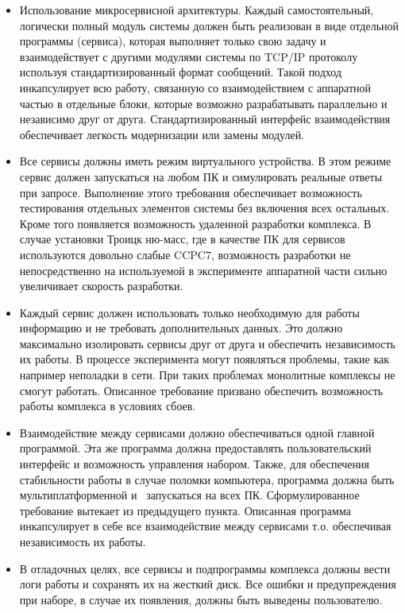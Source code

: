 \documentclass[a4paper,14pt]{extreport}
\begin{document}
\begin{itemize}
    \item Использование микросервисной архитектуры. Каждый самостоятельный, логически полный модуль системы должен быть реализован в виде отдельной программы (сервиса), которая выполняет только свою задачу и взаимодействует с другими модулями системы по TCP/IP протоколу используя стандартизированный формат сообщений. Такой подход инкапсулирует всю работу, связанную со взаимодействием с аппаратной частью в отдельные блоки, которые возможно разрабатывать параллельно и независимо друг от друга. Стандартизированный интерфейс взаимодействия обеспечивает легкость модернизации или замены модулей.
    \item Все сервисы должны иметь режим виртуального устройства. В этом режиме сервис должен запускаться на любом ПК и симулировать реальные ответы при запросе. Выполнение этого требования обеспечивает возможность тестирования отдельных элементов системы без включения всех остальных. Кроме того появляется возможность удаленной разработки комплекса. В случае установки Троицк ню-масс, где в качестве ПК для сервисов используются довольно слабые CCPC7\cite{ccpc7}, возможность разработки не непосредственно на используемой в эксперименте аппаратной части сильно увеличивает скорость разработки.
    \item Каждый сервис должен использовать только необходимую для работы информацию и не требовать дополнительных данных. Это должно максимально изолировать сервисы друг от друга и обеспечить независимость их работы. В процессе эксперимента могут появляться проблемы, такие как например неполадки в сети. При таких проблемах монолитные комплексы не смогут работать. Описанное требование призвано обеспечить возможность работы комплекса в условиях сбоев.
    \item Взаимодействие между сервисами должно обеспечиваться одной главной программой. Эта же программа должна предоставлять пользовательский интерфейс и возможность управления набором. Также, для обеспечения стабильности работы в случае поломки компьютера, программа должна быть мультиплатформенной и \ запускаться на всех ПК. Сформулированное требование вытекает из предыдущего пункта. Описанная программа инкапсулирует в себе все взаимодействие между сервисами т.о. обеспечивая независимость их работы.
    \item В отладочных целях, все сервисы и подпрограммы комплекса должны вести логи работы и сохранять их на жесткий диск. Все ошибки и предупреждения при наборе, в случае их появления, должны быть выведены пользователю.
\end{itemize}
\end{document}
